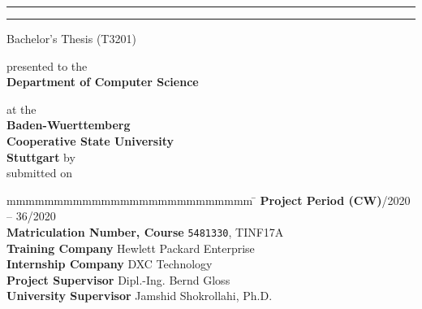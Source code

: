 \hfill
{}

\vfill\vfill

\begin{center}
	\rule{\linewidth}{1pt}
	{
		\Huge \bfseries
			\@title
		\par	
	}
	\vspace{-0.2cm}
	\rule{\linewidth}{1pt}
	

	Bachelor's Thesis (T3201)
	\vfill
	
	presented to the \\ \textbf{Department of Computer Science}
	
	at the \\ \textbf{Baden-Wuerttemberg \\Cooperative State University\\Stuttgart}
	\vfill
	by \\ \textbf{\textsc{\@author}}
	\vfill \vfill
	submitted on \\ \textbf{\@date}
\end{center}

\vfill\vfill

\begin{tabbing}
	mmmmmmmmmmmmmmmmmmmmmmmmmm				\= \kill
	\textbf{Project Period (CW)}/2020 -- 36/2020 \\
	\textbf{Matriculation Number, Course} \> \texttt{5481330}, TINF17A \\
	\textbf{Training Company} \> Hewlett Packard Enterprise \\
	\textbf{Internship Company} \> DXC Technology \\
	\textbf{Project Supervisor} \> Dipl.-Ing. Bernd Gloss \\
	\textbf{University Supervisor} \> Jamshid Shokrollahi, Ph.D.
\end{tabbing}